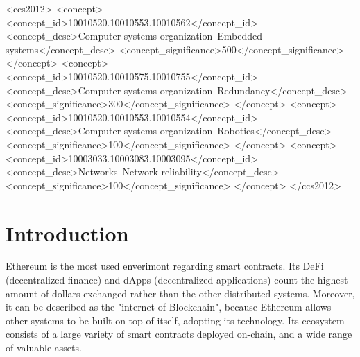\documentclass[a4paper,sigconf, language=french,
language=german, language=spanish, language=english]{acmart}
\begin{document}
\begin{CCSXML}
<ccs2012>
 <concept>
  <concept_id>10010520.10010553.10010562</concept_id>
  <concept_desc>Computer systems organization~Embedded systems</concept_desc>
  <concept_significance>500</concept_significance>
 </concept>
 <concept>
  <concept_id>10010520.10010575.10010755</concept_id>
  <concept_desc>Computer systems organization~Redundancy</concept_desc>
  <concept_significance>300</concept_significance>
 </concept>
 <concept>
  <concept_id>10010520.10010553.10010554</concept_id>
  <concept_desc>Computer systems organization~Robotics</concept_desc>
  <concept_significance>100</concept_significance>
 </concept>
 <concept>
  <concept_id>10003033.10003083.10003095</concept_id>
  <concept_desc>Networks~Network reliability</concept_desc>
  <concept_significance>100</concept_significance>
 </concept>
</ccs2012>
\end{CCSXML}






\maketitle

\section{Introduction}
Ethereum is the most used enverimont regarding smart contracts. Its DeFi (decentralized ﬁnance) 
and dApps (decentralized applications) count the highest amount of dollars exchanged rather than the other distributed systems. Moreover, it can be described as the "internet of Blockchain", because Ethereum allows other systems to be built on top of itself, adopting its technology.
Its ecosystem consists of a large
variety of smart contracts deployed on-chain, and a wide range of
valuable assets. 
\end{document}
